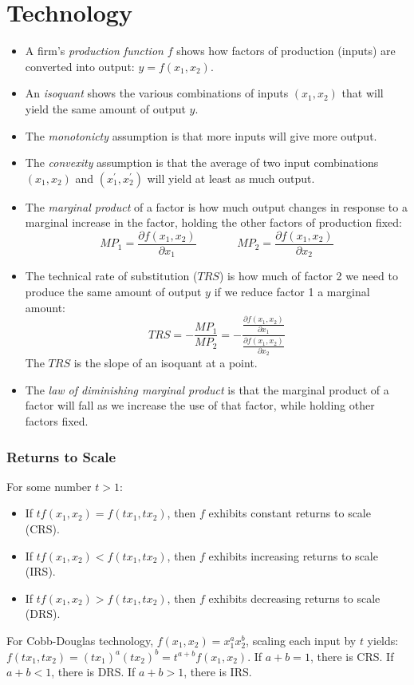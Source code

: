 \documentclass{article}
\begin{document}
\section{Technology}
\begin{itemize}
  \item A firm's \emph{production function} $f$ shows how factors of production
    (inputs) are converted into output: $y=f\left( x_1,x_2 \right)$.
  \item An \emph{isoquant} shows the various combinations of inputs $\left(
    x_1,x_2 \right)$ that will yield the same amount of output $y$.
  \item The \emph{monotonicty} assumption is that more inputs will give more
    output.
  \item The \emph{convexity} assumption is that the average of two input
    combinations $\left( x_1,x_2 \right)$ and $\left( x_1^\prime, x_2^\prime
    \right)$ will yield at least as much output.
  \item The \emph{marginal product} of a factor is how much output changes in
    response to a marginal increase in the factor, holding the other factors of
    production fixed:
    \[
      MP_1 = \frac{\partial f\left( x_1,x_2 \right)}{\partial x_1}
      \;\;\;\;\;\;\;\;\;\;\;\;\;
      MP_2 = \frac{\partial f\left( x_1,x_2 \right)}{\partial x_2}
    \]
  \item The technical rate of substitution ($TRS$) is how much of factor 2 we
    need to produce the same amount of output $y$ if we reduce factor 1 a
    marginal amount:
    \[
      TRS = - \frac{MP_1}{MP_2} =
      - \frac{\frac{\partial f\left( x_1,x_2 \right)}{\partial
      x_1}}{\frac{\partial f\left( x_1,x_2 \right)}{\partial x_2}}
    \]
    The $TRS$ is the slope of an isoquant at a point.
  \item The \emph{law of diminishing marginal product} is that the marginal
    product of a factor will fall as we increase the use of that factor, while
    holding other factors fixed.
\end{itemize}
\subsubsection*{Returns to Scale}
For some number $t>1$:
\begin{itemize}
  \item If $tf\left( x_1,x_2 \right) = f\left( tx_1,tx_2 \right)$, then $f$
    exhibits constant returns to scale (CRS).
  \item If $tf\left( x_1,x_2 \right) < f\left( tx_1,tx_2 \right)$, then $f$
    exhibits increasing returns to scale (IRS).
  \item If $tf\left( x_1,x_2 \right) > f\left( tx_1,tx_2 \right)$, then $f$
    exhibits decreasing returns to scale (DRS).
\end{itemize}
For Cobb-Douglas technology, $f\left( x_1,x_2 \right)=x_1^ax_2^b$, scaling each
input by $t$ yields: $f\left( tx_1,tx_2 \right)= \left( tx_1 \right)^a\left(
tx_2\right)^b=t^{a+b}f\left( x_1,x_2 \right)$. If $a+b=1$, there is CRS. If
$a+b<1$, there is DRS. If $a+b>1$, there is IRS.
\end{document}
